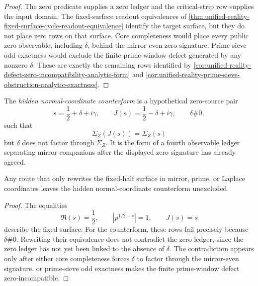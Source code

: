 \begin{proof}
The zero predicate supplies a zero ledger and the critical-strip row
supplies the input domain.  The fixed-surface readout equivalences of
\autoref{thm:unified-reality-fixed-surface-cycle-readout-equivalence}
identify the target surface, but they do not place zero rows on that
surface.  Core completeness would place every public zero observable,
including $\delta$, behind the mirror-even zero signature.  Prime-sieve
odd exactness would exclude the finite prime-window defect generated by
any nonzero $\delta$.  These are exactly the remaining rows identified by
\autoref{cor:unified-reality-defect-zero-incompatibility-analytic-form}
and
\autoref{cor:unified-reality-prime-sieve-obstruction-analytic-exactness}.
\end{proof}

\begin{definition}
\label{def:unified-reality-hidden-normal-coordinate-counterform}
The \emph{hidden normal-coordinate counterform} is a hypothetical
zero-source pair
$$
s=\frac12+\delta+i\gamma,
\qquad
J(s)=\frac12-\delta+i\gamma,
\qquad
\delta\#0,
$$
such that
$$
\Sigma_Z(J(s))=\Sigma_Z(s)
$$
but $\delta$ does not factor through $\Sigma_Z$.  It is the form of a
fourth observable ledger separating mirror companions after the displayed
zero signature has already agreed.
\end{definition}

\begin{theorem}
\label{thm:unified-reality-hidden-normal-coordinate-circularity-boundary}
Any route that only rewrites the fixed-half surface in mirror, prime, or
Laplace coordinates leaves the hidden normal-coordinate counterform
unexcluded.
\end{theorem}

\begin{proof}
The equalities
$$
\Re(s)=\frac12,
\qquad
|p^{1/2-s}|=1,
\qquad
J(s)=s
$$
describe the fixed surface.  For the counterform, these rows fail
precisely because $\delta\#0$.  Rewriting their equivalence does not
contradict the zero ledger, since the zero ledger has not yet been linked
to the absence of $\delta$.  The contradiction appears only after either
core completeness forces $\delta$ to factor through the mirror-even
signature, or prime-sieve odd exactness makes the finite prime-window
defect zero-incompatible.
\end{proof}

